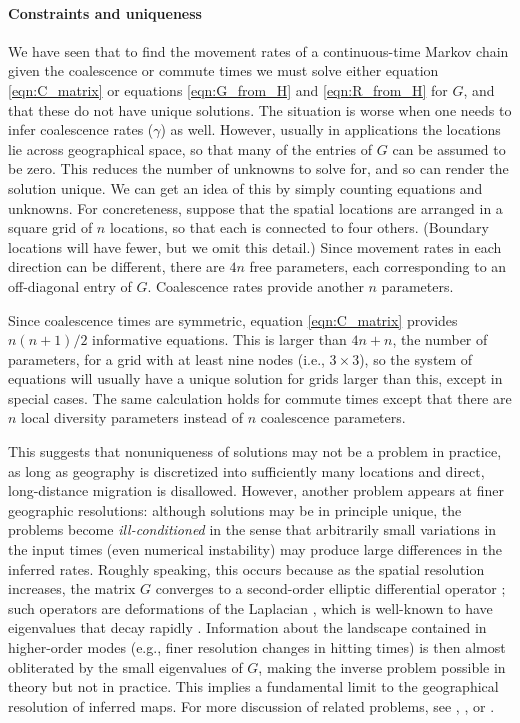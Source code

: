 \documentclass{article}
\begin{document}
\paragraph{Constraints and uniqueness}
We have seen that to find the movement rates of a continuous-time Markov chain
given the coalescence or commute times
we must solve either equation \eqref{eqn:C_matrix} 
or equations \eqref{eqn:G_from_H} and \eqref{eqn:R_from_H} for $G$,
and that these do not have unique solutions.
The situation is worse when one needs to infer coalescence rates ($\gamma$) as well.
However, usually in applications the locations lie across geographical space,
so that many of the entries of $G$ can be assumed to be zero.
This reduces the number of unknowns to solve for,
and so can render the solution unique.
We can get an idea of this by simply counting equations and unknowns.
For concreteness, suppose that the spatial locations
are arranged in a square grid of $n$ locations,
so that each is connected to four others.
(Boundary locations will have fewer, but we omit this detail.)
Since movement rates in each direction can be different,
there are $4n$ free parameters, each corresponding to an off-diagonal entry of $G$.
Coalescence rates provide another $n$ parameters.

Since coalescence times are symmetric, 
equation \eqref{eqn:C_matrix} provides $n (n+1)/2$ informative equations.
This is larger than $4n+n$, the number of parameters,
for a grid with at least nine nodes (i.e., $3 \times 3$),
so the system of equations will usually have a unique solution
for grids larger than this, except in special cases.
The same calculation holds for commute times 
except that there are $n$ local diversity parameters instead of $n$ coalescence parameters.

This suggests that nonuniqueness of solutions may not be a problem in practice,
as long as geography is discretized into sufficiently many locations
and direct, long-distance migration is disallowed. 
However, another problem appears at finer geographic resolutions:
although solutions may be in principle unique,
the problems become \emph{ill-conditioned} 
in the sense that arbitrarily small variations in the input times
(even numerical instability)
may produce large differences in the inferred rates.
Roughly speaking, this occurs because as the spatial resolution increases,
the matrix $G$ converges to a second-order elliptic differential operator \citep{stroock1997multidimensional};
such operators are deformations of the Laplacian \citep{feller4},
which is well-known to have eigenvalues that decay rapidly 
\citep{hpmckean1967curvature,kuttler1984eigenvalues}.
Information about the landscape contained in higher-order modes
(e.g., finer resolution changes in hitting times)
is then almost obliterated by the small eigenvalues of $G$,
making the inverse problem possible in theory but not in practice.
This implies a fundamental limit to the geographical resolution of inferred maps.
For more discussion of related problems, see 
\citet{epstein2008badtruth}, \citet{myers2008learn}, or \citet{terhorst2015fundamental}.
\end{document}
